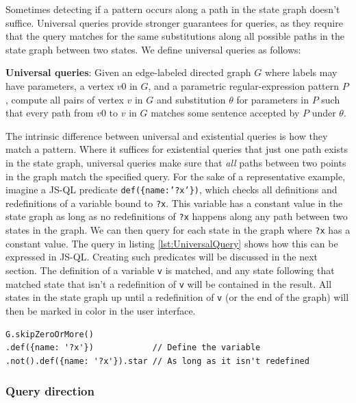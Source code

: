 Sometimes detecting if a pattern occurs along a path in the state graph doesn't suffice. Universal queries provide stronger guarantees for queries, as they require that the query matches for the same substitutions along all possible paths in the state graph between two states. We define universal queries as follows:
\begin{definition}
\textbf{Universal queries}: Given an edge-labeled directed graph $G$ where labels may have parameters, a vertex $v0$ in $G$, and a parametric regular-expression pattern $P$, compute all pairs of vertex $v$ in $G$ and substitution $\theta$ for parameters in $P$ such that every path from $v0$ to $v$ in $G$ matches some sentence accepted by $P$ under $\theta$.
\end{definition}

The intrinsic difference between universal and existential queries is how they match a pattern. Where it suffices for existential queries that just one path exists in the state graph, universal queries make sure that \textit{all} paths between two points in the graph match the specified query. For the sake of a representative example, imagine a JS-QL predicate \texttt{def(\{name:'?x'\})}, which checks all definitions and redefinitions of a variable bound to \texttt{?x}. This variable has a constant value in the state graph as long as no redefinitions of \texttt{?x} happens along any path between two states in the graph. We can then query for each state in the graph where \texttt{?x} has a constant value. The query in listing \ref{lst:UniversalQuery} shows how this can be expressed in JS-QL. Creating such predicates will be discussed in the next section. The definition of a variable \texttt{v} is matched, and any state following that matched state that isn't a redefinition of \texttt{v} will be contained in the result. All states in the state graph up until a redefinition of \texttt{v} (or the end of the graph) will then be marked in color in the user interface.

\begin{lstlisting}[label={lst:UniversalQuery},language=JSQL, caption=Checking for constant folding using a universal query,mathescape=true]
G.skipZeroOrMore()
.def({name: '?x'})            // Define the variable
.not().def({name: '?x'}).star // As long as it isn't redefined
\end{lstlisting}

\subsubsection{Query direction}

